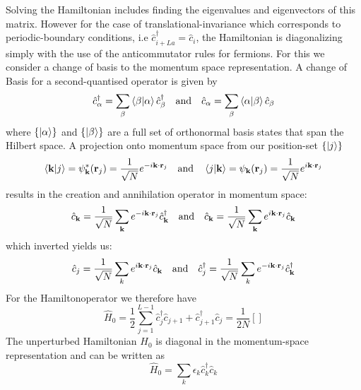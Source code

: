 \documentclass[11pt, a4paper]{article}
\theoremstyle{definition} %
\begin{document}
	Solving the Hamiltonian includes finding the eigenvalues and eigenvectors of this matrix. However for the case of translational-invariance which corresponds to periodic-boundary conditions, i.e $\hat{c}_{i + La}^\dagger = \hat{c}_i$, the Hamiltonian is diagonalizing simply with the use of the anticommutator rules for fermions. For this we consider a change of basis to the momentum space representation. A change of Basis for a second-quantised operator is given by
	\begin{equation}
		\hat{c}_\alpha^\dagger = \sum_\beta \braket{\beta}{\alpha} \hat{c}_\beta^\dagger \qq{and} \hat{c}_\alpha = \sum_\beta \braket{\alpha}{\beta} \hat{c}_\beta
	\end{equation}
	where $\{\ket{\alpha}\}$ and $\{\ket{\beta}\}$ are a full set of orthonormal basis states that span the Hilbert space. A projection onto momentum space from our position-set $\{\ket{j}\}$
		\begin{equation}
		\braket{\mathbf{k}}{j} = \psi_{\mathbf{k}}^*(\mathbf{r}_j) = \frac{1}{\sqrt{N}} e^{-i \mathbf{k} \cdot \mathbf{r}_j} \qq{and} \braket{j}{\mathbf{k}} = \psi_\mathbf{k}(\mathbf{r}_j) = \frac{1}{\sqrt{N}} e^{i \mathbf{k} \cdot \mathbf{r}_j}
	\end{equation}
	results in the creation and annihilation operator in momentum space:
	\begin{equation}
		\hat{c}_{\mathbf{k}} = \frac{1}{\sqrt{N}}  \sum_{\mathbf{k}} e^{-i \mathbf{k}\cdot \mathbf{r}_j} \hat{c}_{\mathbf{k}}^\dagger \qq{and} \hat{c}_\mathbf{k} = \frac{1}{\sqrt{N}} \sum_\mathbf{k} e^{i \mathbf{k} \cdot \mathbf{r}_j} \hat{c}_\mathbf{k}
	\end{equation}
	which inverted yields us:
	\begin{equation}
		\hat{c}_j = \frac{1}{\sqrt{N}} \sum_k e^{i \mathbf{k}\cdot \mathbf{r}_j} \hat{c}_\mathbf{k} \qq{and} \hat{c}_j^\dagger = \frac{1}{\sqrt{N}} \sum_k e^{-i\mathbf{k}\cdot \mathbf{r}_j} \hat{c}_\mathbf{k}^\dagger
	\end{equation}
	For the Hamiltonoperator we therefore have
	\begin{equation}
		\hat{H}_0 = \frac{1}{2}\sum_{j=1}^{L-1}  \hat{c}_j^\dagger \hat{c}_{j+1} +\hat{c}_{j+1}^\dagger \hat{c}_j = \frac{1}{2N}\left[ \right]
	\end{equation}
	The unperturbed Hamiltonian $H_0$ is diagonal in the momentum-space representation and can be written as
	\begin{equation}
		\hat{H}_0 = \sum_k \epsilon_k \hat{c}_k^\dagger \hat{c}_k
	\end{equation}
\end{document}
